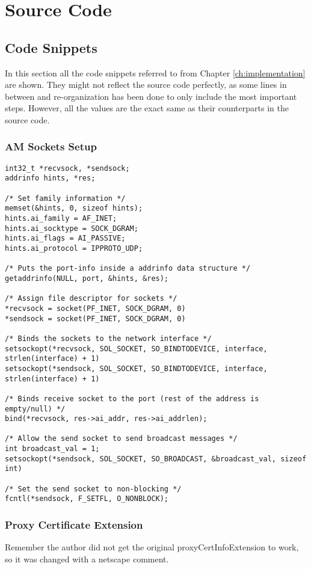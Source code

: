 \chapter{Source Code}
\label{appendix:source}
\acresetall


\section{Code Snippets}
In this section all the code snippets referred to from Chapter
\ref{ch:implementation} are shown. They might not reflect the source code
perfectly, as some lines in between and re-organization has been done to only
include the most important steps. However, all the values are the exact same as
their counterparts in the source code.

\subsection{AM Sockets Setup}\label{code:sockets}
\begin{lstlisting}[frame=tb]
int32_t *recvsock, *sendsock;
addrinfo hints, *res;

/* Set family information */
memset(&hints, 0, sizeof hints);
hints.ai_family = AF_INET;
hints.ai_socktype = SOCK_DGRAM;
hints.ai_flags = AI_PASSIVE;
hints.ai_protocol = IPPROTO_UDP;

/* Puts the port-info inside a addrinfo data structure */
getaddrinfo(NULL, port, &hints, &res);

/* Assign file descriptor for sockets */
*recvsock = socket(PF_INET, SOCK_DGRAM, 0)
*sendsock = socket(PF_INET, SOCK_DGRAM, 0)

/* Binds the sockets to the network interface */
setsockopt(*recvsock, SOL_SOCKET, SO_BINDTODEVICE, interface, strlen(interface) + 1)
setsockopt(*sendsock, SOL_SOCKET, SO_BINDTODEVICE, interface, strlen(interface) + 1)

/* Binds receive socket to the port (rest of the address is empty/null) */
bind(*recvsock, res->ai_addr, res->ai_addrlen);

/* Allow the send socket to send broadcast messages */
int broadcast_val = 1;
setsockopt(*sendsock, SOL_SOCKET, SO_BROADCAST, &broadcast_val, sizeof int)

/* Set the send socket to non-blocking */
fcntl(*sendsock, F_SETFL, O_NONBLOCK);

\end{lstlisting}

\subsection{Proxy Certificate Extension}\label{code:pc_ext}
Remember the author did not get the original proxyCertInfoExtension to work, so
it was changed with a netscape comment.

